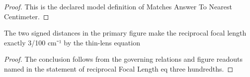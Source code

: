 \begin{proof}
  This is the declared model definition of Matches Answer To Nearest Centimeter.
\end{proof}
\begin{lemma}
  \label{lem:physics:phyx-mini-0044:phyxminiproblems-problemphyxmini0044-reciprocalfocallength-eq-three-hundredths}
  The two signed distances in the primary figure make the reciprocal focal length exactly 3/100 cm⁻¹ by the thin-lens equation
\end{lemma}
\begin{proof}
  The conclusion follows from the governing relations and figure readouts named in the statement of reciprocal Focal Length eq three hundredths.
\end{proof}
